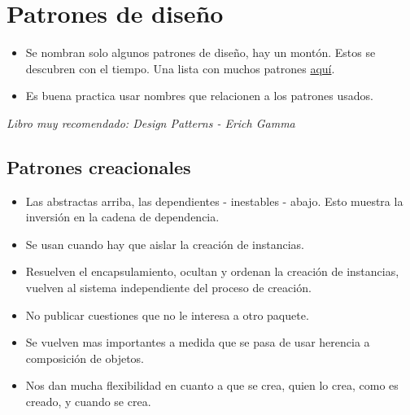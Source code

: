 \section{Patrones de diseño}


\begin{itemize}
\item Se nombran solo algunos patrones de diseño, hay un montón. Estos se descubren con el tiempo. Una lista con muchos patrones \href{https://java-design-patterns.com/patterns/}{aquí}.
\item Es buena practica usar nombres que relacionen a los patrones usados.
\end{itemize}

\medskip
\textit{Libro muy recomendado: Design Patterns - Erich Gamma}

\subsection*{Patrones creacionales}
\begin{itemize}
\item Las abstractas arriba, las dependientes - inestables - abajo. Esto muestra la inversión en la cadena de dependencia.
\item Se usan cuando hay que aislar la creación de instancias.
\item Resuelven el encapsulamiento, ocultan y ordenan la creación de instancias, vuelven al sistema independiente del proceso de creación.
\item No publicar cuestiones que no le interesa a otro paquete.
\item Se vuelven mas importantes a medida que se pasa de usar herencia a composición de objetos.
\item Nos dan mucha flexibilidad en cuanto a que se crea, quien lo crea, como es creado, y cuando se crea.
\end{itemize}


